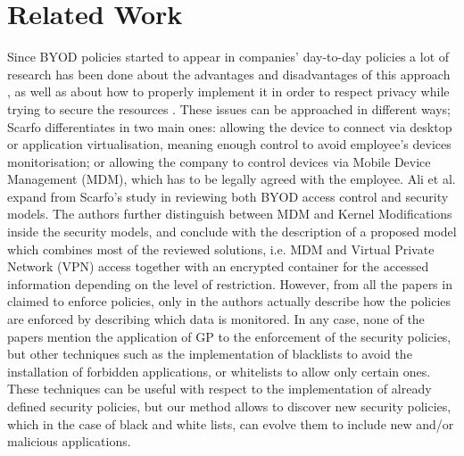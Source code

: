 \documentclass[a4paper,10pt,twocolumn,preprint,3p]{elsarticle}
\begin{document}
\section{Related Work}
\label{sec:SotA}

Since BYOD policies started to appear in companies' day-to-day policies  a lot
of research has been done about the advantages and disadvantages of
this approach \cite{singh2012byod}, as well as about how to properly implement it in order to
respect privacy while trying to secure the resources \cite{scarfo2012new, ali2015analysis, de2015corporate}.
These issues can be approached in different ways; Scarfo
differentiates in \cite{scarfo2012new} two main ones: allowing the
device to connect via desktop or application virtualisation, meaning
enough control to avoid employee's devices monitorisation; or allowing
the company to control devices
via Mobile Device Management (MDM), which has to be legally agreed
with the employee. %
 Ali et al. expand from Scarfo's study in
\cite{ali2015analysis} reviewing both BYOD access control
 and security models. The authors further distinguish
between MDM and Kernel Modifications inside the security models, and
conclude with the description of a proposed model which combines most
of the reviewed solutions, i.e. MDM and Virtual Private Network (VPN)
access together with an encrypted container for the accessed
information depending on the level of restriction. However, from all
the papers in \cite{ali2015analysis} claimed to enforce policies, only
in \cite{rhee2013high} the authors actually describe how the policies
are enforced by describing which data is monitored. In any case, none
of the papers mention the application of GP to the enforcement of the
security policies, but other techniques such as the implementation of
blacklists to avoid the installation of forbidden applications, or
whitelists to allow only certain ones. These techniques can be useful
with respect to the implementation of already defined security
policies, but our method allows to discover new security policies,
which in the case of black and white lists, can evolve them to include
new and/or malicious applications. 
\end{document}

